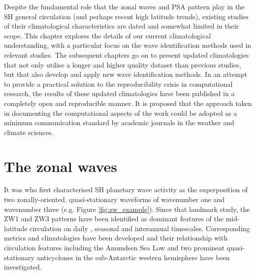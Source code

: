 Despite the fundamental role that the zonal waves and PSA pattern play in the SH general circulation (and perhaps recent high latitude trends), existing studies of their climatological characteristics are dated and somewhat limited in their scope. This chapter explores the details of our current climatological understanding, with a particular focus on the wave identification methods used in relevant studies. The subsequent chapters go on to present updated climatologies that not only utilise a longer and higher quality dataset than previous studies, but that also develop and apply new wave identification methods. In an attempt to provide a practical solution to the reproducibility crisis in computational research, the results of these updated climatologies have been published in a completely open and reproducible manner. It is proposed that the approach taken in documenting the computational aspects of the work could be adopted as a minimum communication standard by academic journals in the weather and climate sciences.


\section{The zonal waves}\label{s:zw_overview}

It was \citet{vanLoon1972} who first characterised SH planetary wave activity as the superposition of two zonally-oriented, quasi-stationary waveforms of wavenumber one and wavenumber three (e.g. Figure \ref{fig:zw_example}). Since that landmark study, the ZW1 and ZW3 patterns have been identified as dominant features of the mid-latitude circulation on daily \citep[e.g.][]{Kidson1988}, seasonal \citep[e.g.][]{Mo1985} and interannual \citep[e.g.][]{Karoly1989} timescales. Corresponding metrics and climatologies have been developed \citep{Raphael2004,Hobbs2007} and their relationship with circulation features including the Amundsen Sea Low \citep[ASL;][]{Turner2013} and two prominent quasi-stationary anticyclones in the sub-Antarctic western hemisphere \citep{Hobbs2010} have been investigated.

